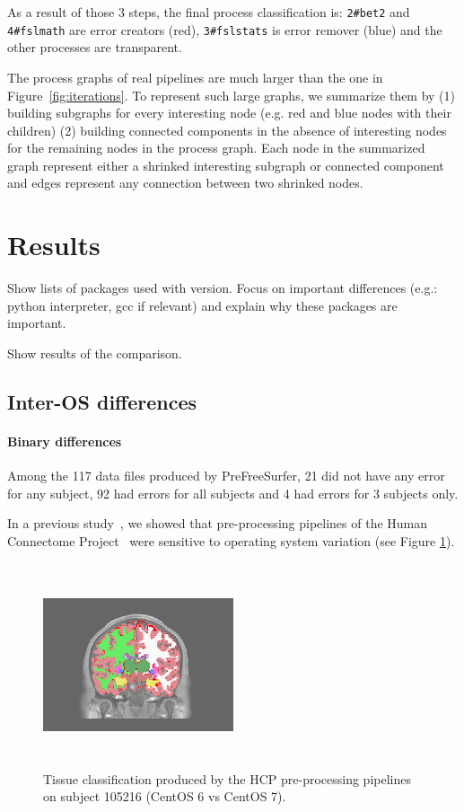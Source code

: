 \documentclass{article}
\begin{document}
 As a result of those 3 steps, the final process classification is: 
 \texttt{2\#bet2} and \texttt{4\#fslmath} are error creators (red), 
 \texttt{3\#fslstats} is error remover (blue) and the other processes 
 are transparent.

The process graphs of real pipelines are much larger than the one in 
Figure~\ref{fig:iterations}. To represent such large graphs, we 
summarize them by (1) building subgraphs for every interesting node 
(e.g. red and blue nodes with their children) (2) building connected components 
in the absence of interesting nodes for the remaining nodes in the process graph. 
Each node in the summarized graph represent either a shrinked interesting subgraph or 
connected component and edges represent any connection between two shrinked nodes.

\section{Results}

Show lists of packages used with version. Focus on important
differences (e.g.: python interpreter, gcc if relevant) and explain
why these packages are important.

Show results of the comparison.

\subsection{Inter-OS differences}


\paragraph{Binary differences}


Among the 117 data files produced by PreFreeSurfer, 21 did not have any error for any subject, 92 had errors 
for all subjects and 4 had errors for 3 subjects only. 

In a previous study~\cite{Scaria2017}, we showed that
pre-processing pipelines of the Human Connectome
Project~\cite{Glasser2013} were sensitive to operating system
variation (see Figure \ref{fig:1}).
\begin{figure}[H]
  \includegraphics[width=0.5\textwidth, height=6cm]{images/brain_classification.png}
  \caption{Tissue classification produced by the HCP pre-processing
    pipelines on subject 105216 (CentOS 6 vs CentOS 7).}
  \label{fig:1}
\end{figure}
\end{document}
